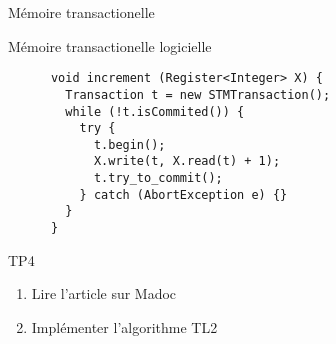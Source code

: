 
\begingroup

\begin{frame}[fragile]{Mémoire transactionelle}

  \vFill
  \begin{block}{Mémoire transactionelle logicielle}
    \begin{lstlisting}
      void increment (Register<Integer> X) {
        Transaction t = new STMTransaction();
        while (!t.isCommited()) {
          try {
            t.begin();
            X.write(t, X.read(t) + 1);
            t.try_to_commit();
          } catch (AbortException e) {}
        }
      }
    \end{lstlisting}
  \end{block}
  \pause
  \begin{alertblock}{TP4}
    \begin{enumerate}
    \item Lire l'article sur Madoc
      
    \item Implémenter l'algorithme TL2
    \end{enumerate}
  \end{alertblock}
  \vFill


\end{frame}

\endgroup
\endinput
